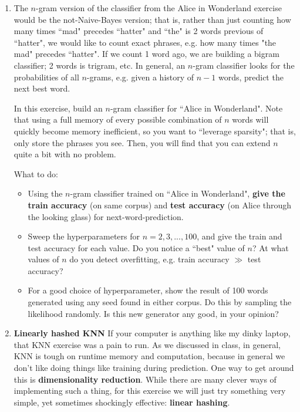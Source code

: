 \documentclass{article}
\begin{document}
 \begin{enumerate}
 \item 
The $n$-gram version of the classifier from the Alice in Wonderland exercise would be the not-Naive-Bayes version; that is, rather than just counting how many times ``mad" precedes ``hatter" and ``the" is 2 words previous of ``hatter", we would like to count exact phrases, e.g. how many times "the mad" precedes ``hatter". If we count 1 word ago, we are building a bigram classifier; 2 words is trigram, etc. In general, an $n$-gram classifier looks for the probabilities of all $n$-grams, e.g. given a history of $n-1$ words, predict the next best word. 

In this exercise, build an $n$-gram classifier for ``Alice in Wonderland". Note that using a full memory of every possible combination of $n$ words will quickly become memory inefficient, so you want to ``leverage sparsity"; that is, only store the phrases you see. Then, you will find that you can extend $n$ quite a bit with no problem.

 What to do:
\begin{itemize}
\item 
Using the $n$-gram classifier trained on ``Alice in Wonderland", \textbf{give the train accuracy} (on same corpus) and \textbf{test accuracy} (on Alice through the looking glass) for next-word-prediction. 

\item Sweep the hyperparameters for $n = 2,3,...,100$, and give the train and test accuracy for each value. Do you notice a ``best" value of $n$? At what values of $n$ do you detect overfitting, e.g. train accuracy $\gg$ test accuracy?

\item For a good choice of hyperparameter, show the result of 100 words generated using any seed found in either corpus. Do this by sampling the likelihood randomly. Is this new generator any good, in your opinion?
\end{itemize}



\item 
 \textbf{Linearly hashed KNN} If your computer is anything like my dinky laptop, that KNN exercise was a pain to run. As we discussed in class, in general, KNN is tough on runtime memory and computation, because in general we don't like doing things like training during prediction. One way to get around this is \textbf{dimensionality reduction}. While there are many clever ways of implementing such a thing, for this exercise we will just try something very simple, yet sometimes shockingly effective: \textbf{linear hashing}. 
 

\end{enumerate}
\end{document}
